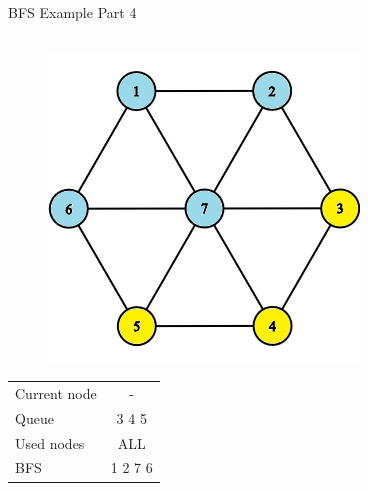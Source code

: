 \documentclass[aspectratio=169]{beamer}%
\begin{document}
\begin{frame}{BFS Example Part 4}
\begin{columns}
\begin{column}{0.32\textwidth}
\begin{figure}[!ht]
                \centering
                \includegraphics[width=0.9\linewidth]{bfs 12.png}
            \end{figure}
            \begin{table}[ht]
                \centering
                \begin{tabular}{l c}
                    Current node & -\\
                    Queue & 3 4 5\\ 
                    Used nodes & ALL\\
                    BFS & 1 2 7 6
                \end{tabular}
            \end{table}
        \end{column}
    \end{columns}
\end{frame}
\end{document}
